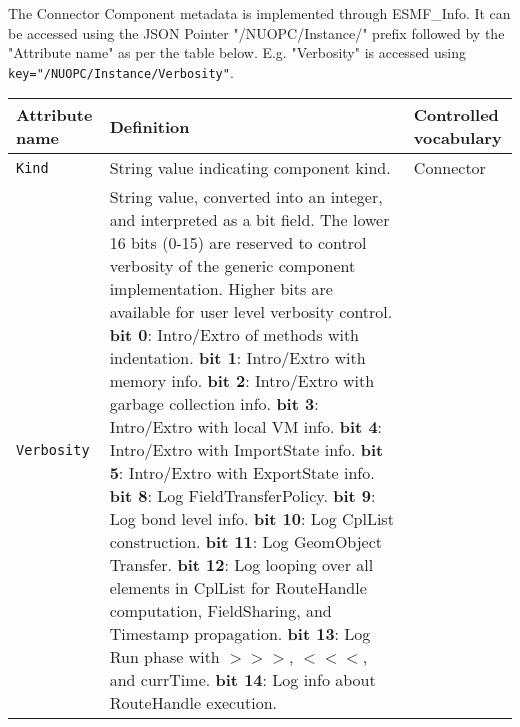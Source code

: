 \label{ConnectorCompMeta}
The Connector Component metadata is implemented through ESMF\_Info. It can be accessed
using the JSON Pointer "/NUOPC/Instance/" prefix followed by the "Attribute name"
as per the table below. E.g. "Verbosity" is accessed using {\tt key="/NUOPC/Instance/Verbosity"}.

\begin{longtable}{|p{}|p{}|p{}|}
     \hline\hline
     {\bf Attribute name} & {\bf Definition} & {\bf Controlled vocabulary}\\
     \hline\hline
     {\tt Kind} & String value indicating component kind.& Connector\\ \hline
     {\tt Verbosity} & String value, converted into an integer, and interpreted as a bit field. The lower 16 bits (0-15) are reserved to control verbosity of the generic component implementation. Higher bits are available for user level verbosity control. \newline
                       {\bf bit 0}: Intro/Extro of methods with indentation.\newline
                       {\bf bit 1}: Intro/Extro with memory info.\newline
                       {\bf bit 2}: Intro/Extro with garbage collection info.\newline
                       {\bf bit 3}: Intro/Extro with local VM info.\newline
                       {\bf bit 4}: Intro/Extro with ImportState info.\newline
                       {\bf bit 5}: Intro/Extro with ExportState info.\newline
                       {\bf bit 8}: Log FieldTransferPolicy.\newline
                       {\bf bit 9}: Log bond level info.\newline
                       {\bf bit 10}: Log CplList construction.\newline
                       {\bf bit 11}: Log GeomObject Transfer.\newline
                       {\bf bit 12}: Log looping over all elements in CplList for RouteHandle computation, FieldSharing, and Timestamp propagation.\newline
                       {\bf bit 13}: Log Run phase with $>>>$, $<<<$, and currTime.\newline
                       {\bf bit 14}: Log info about RouteHandle execution.\newline

\end{longtable}
